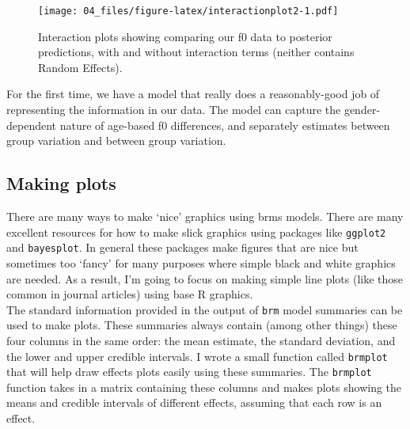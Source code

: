 \documentclass[
]{book}
\newenvironment{Shaded}{\begin{snugshade}}{\end{snugshade}}
\newcommand{\AttributeTok}[1]{\textcolor[rgb]{0.77,0.63,0.00}{#1}}
\newcommand{\DecValTok}[1]{\textcolor[rgb]{0.00,0.00,0.81}{#1}}
\newcommand{\FloatTok}[1]{\textcolor[rgb]{0.00,0.00,0.81}{#1}}
\newcommand{\FunctionTok}[1]{\textcolor[rgb]{0.00,0.00,0.00}{#1}}
\newcommand{\NormalTok}[1]{#1}
\newcommand{\SpecialCharTok}[1]{\textcolor[rgb]{0.00,0.00,0.00}{#1}}
\newcommand{\StringTok}[1]{\textcolor[rgb]{0.31,0.60,0.02}{#1}}
\begin{document}
\begin{Shaded}
\end{Shaded}

\begin{figure}
\centering
\texttt{[image: 04\_files/figure-latex/interactionplot2-1.pdf]}
\caption{\label{fig:interactionplot2}Interaction plots showing comparing our f0 data to posterior predictions, with and without interaction terms (neither contains Random Effects).}
\end{figure}

For the first time, we have a model that really does a reasonably-good job of representing the information in our data. The model can capture the gender-dependent nature of age-based f0 differences, and separately estimates between group variation and between group variation.

\hypertarget{making-plots}{%
\subsection{Making plots}\label{making-plots}}

There are many ways to make `nice' graphics using brms models. There are many excellent resources for how to make slick graphics using packages like \texttt{ggplot2} and \texttt{bayesplot}. In general these packages make figures that are nice but sometimes too `fancy' for many purposes where simple black and white graphics are needed. As a result, I'm going to focus on making simple line plots (like those common in journal articles) using base R graphics.\\
The standard information provided in the output of \texttt{brm} model summaries can be used to make plots. These summaries always contain (among other things) these four columns in the same order: the mean estimate, the standard deviation, and the lower and upper credible intervals. I wrote a small function called \texttt{brmplot} that will help draw effects plots easily using these summaries. The \texttt{brmplot} function takes in a matrix containing these columns and makes plots showing the means and credible intervals of different effects, assuming that each row is an effect.
\end{document}
